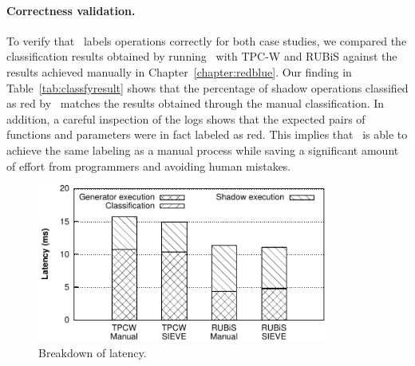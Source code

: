 \paragraph{Correctness validation.} To verify that \tool\ labels operations correctly for
both case studies, we compared  the classification results
obtained by running \tool\ with TPC-W and RUBiS against
the results achieved manually in Chapter~\ref{chapter:redblue}.
Our finding in Table~\ref{tab:classfyresult} shows that
the percentage of shadow operations classified as red by \tool\ 
matches the results obtained through the manual classification.
In addition, a careful inspection of the logs shows that the expected pairs of functions and parameters 
were in fact labeled as red. This implies that \tool\ is able to achieve the same 
labeling as a manual process while saving a significant amount of effort from 
programmers and avoiding human mistakes.
\begin{figure}[t!]
\centering
\includegraphics[width=0.85\textwidth]{./figures/sieve/eval/latencyBreakDownBar1.pdf}
\caption{Breakdown of latency.}
\label{fig:latencybreakdownbar}
\end{figure}

